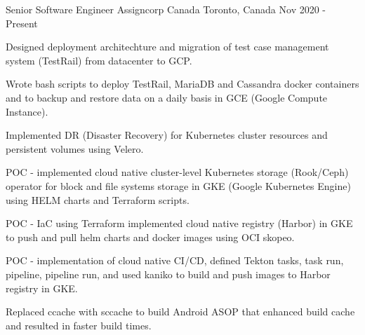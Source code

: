 

\begin{cventries}

  \cventry
    {Senior Software Engineer} %
    {Assigncorp Canada} %
    {Toronto, Canada} %
    {Nov 2020 - Present} %
    {
      \begin{cvitems} %
        \item {Designed deployment architechture and migration of test case management system (TestRail) from datacenter to GCP.}
        \item {Wrote bash scripts to deploy TestRail, MariaDB and Cassandra docker containers and to backup and restore data on a daily basis in GCE (Google Compute Instance).}
        \item {Implemented DR (Disaster Recovery) for Kubernetes cluster resources and persistent volumes using Velero. }
        \item {POC - implemented cloud native cluster-level Kubernetes storage (Rook/Ceph) operator for block and file systems storage in GKE (Google Kubernetes Engine) using HELM charts and Terraform scripts.}
        \item {POC - IaC using Terraform implemented cloud native registry (Harbor) in GKE to push and pull helm charts and docker images using OCI skopeo.}
        \item {POC - implementation of cloud native CI/CD, defined Tekton tasks, task run, pipeline, pipeline run, and used kaniko to build and push images to Harbor registry in GKE.}
        \item {Replaced ccache with sccache to build Android ASOP that enhanced build cache and resulted in faster build times.}
      \end{cvitems}
    }


\end{cventries}
